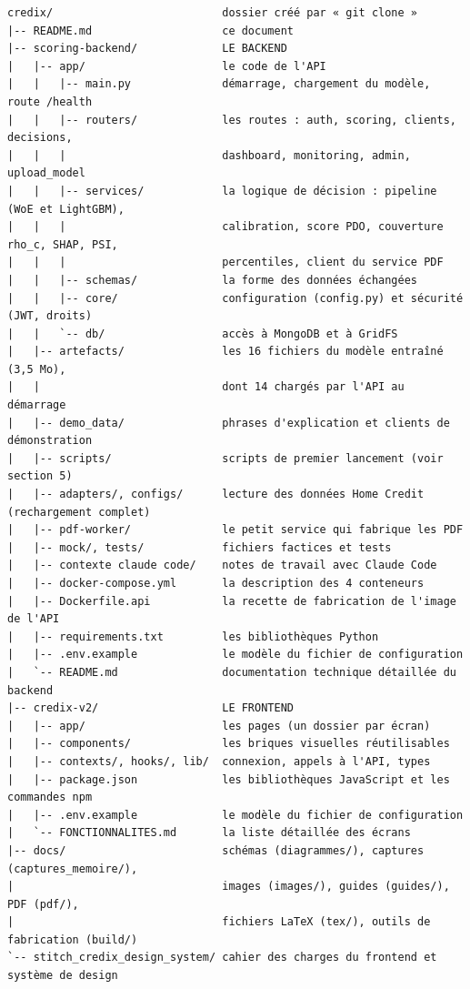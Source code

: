 \documentclass[
  french,
  11pt,
  a4paper,
]{article}
\begin{document}
\begin{Verbatim}[breaklines=true,breakanywhere=true,fontsize=\small,frame=leftline,framerule=1.6pt,rulecolor=\color{credixblue},framesep=3mm,xleftmargin=2mm,xrightmargin=1mm]
credix/                          dossier créé par « git clone »
|-- README.md                    ce document
|-- scoring-backend/             LE BACKEND
|   |-- app/                     le code de l'API
|   |   |-- main.py              démarrage, chargement du modèle, route /health
|   |   |-- routers/             les routes : auth, scoring, clients, decisions,
|   |   |                        dashboard, monitoring, admin, upload_model
|   |   |-- services/            la logique de décision : pipeline (WoE et LightGBM),
|   |   |                        calibration, score PDO, couverture rho_c, SHAP, PSI,
|   |   |                        percentiles, client du service PDF
|   |   |-- schemas/             la forme des données échangées
|   |   |-- core/                configuration (config.py) et sécurité (JWT, droits)
|   |   `-- db/                  accès à MongoDB et à GridFS
|   |-- artefacts/               les 16 fichiers du modèle entraîné (3,5 Mo),
|   |                            dont 14 chargés par l'API au démarrage
|   |-- demo_data/               phrases d'explication et clients de démonstration
|   |-- scripts/                 scripts de premier lancement (voir section 5)
|   |-- adapters/, configs/      lecture des données Home Credit (rechargement complet)
|   |-- pdf-worker/              le petit service qui fabrique les PDF
|   |-- mock/, tests/            fichiers factices et tests
|   |-- contexte claude code/    notes de travail avec Claude Code
|   |-- docker-compose.yml       la description des 4 conteneurs
|   |-- Dockerfile.api           la recette de fabrication de l'image de l'API
|   |-- requirements.txt         les bibliothèques Python
|   |-- .env.example             le modèle du fichier de configuration
|   `-- README.md                documentation technique détaillée du backend
|-- credix-v2/                   LE FRONTEND
|   |-- app/                     les pages (un dossier par écran)
|   |-- components/              les briques visuelles réutilisables
|   |-- contexts/, hooks/, lib/  connexion, appels à l'API, types
|   |-- package.json             les bibliothèques JavaScript et les commandes npm
|   |-- .env.example             le modèle du fichier de configuration
|   `-- FONCTIONNALITES.md       la liste détaillée des écrans
|-- docs/                        schémas (diagrammes/), captures (captures_memoire/),
|                                images (images/), guides (guides/), PDF (pdf/),
|                                fichiers LaTeX (tex/), outils de fabrication (build/)
`-- stitch_credix_design_system/ cahier des charges du frontend et système de design
\end{Verbatim}
\end{document}
